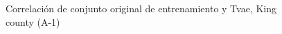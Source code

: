 \begin{figure}[H]
    \centering
    
    \caption{Correlación de conjunto original de entrenamiento y Tvae, King county (A-1)}
    \label{pairwise-king county-a-1-tvae}
\end{figure}